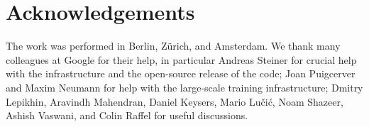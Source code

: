 





\section*{Acknowledgements}
The work was performed in Berlin, Z\"urich, and Amsterdam. We thank many colleagues at Google for their help, in particular Andreas Steiner for crucial help with the infrastructure and the open-source release of the code; Joan Puigcerver and Maxim Neumann for help with the large-scale training infrastructure; Dmitry Lepikhin, Aravindh Mahendran, Daniel Keysers, Mario Lu\v{c}i\'{c}, Noam Shazeer, Ashish Vaswani, and Colin Raffel for useful discussions.





\newpage







\usepackage{amsmath,amsfonts,bm}

\newcommand{\figleft}{{\em (Left)}}
\newcommand{\figcenter}{{\em (Center)}}
\newcommand{\figright}{{\em (Right)}}
\newcommand{\figtop}{{\em (Top)}}
\newcommand{\figbottom}{{\em (Bottom)}}
\newcommand{\captiona}{{\em (a)}}
\newcommand{\captionb}{{\em (b)}}
\newcommand{\captionc}{{\em (c)}}
\newcommand{\captiond}{{\em (d)}}

\newcommand{\newterm}[1]{{\bf #1}}


\def\figref#1{figure~\ref{#1}}
\def\Figref#1{Figure~\ref{#1}}
\def\twofigref#1#2{figures \ref{#1} and \ref{#2}}
\def\quadfigref#1#2#3#4{figures \ref{#1}, \ref{#2}, \ref{#3} and \ref{#4}}
\def\secref#1{section~\ref{#1}}
\def\Secref#1{Section~\ref{#1}}
\def\twosecrefs#1#2{sections \ref{#1} and \ref{#2}}
\def\secrefs#1#2#3{sections \ref{#1}, \ref{#2} and \ref{#3}}
\def\eqref#1{equation~\ref{#1}}
\def\Eqref#1{Equation~\ref{#1}}
\def\plaineqref#1{\ref{#1}}
\def\chapref#1{chapter~\ref{#1}}
\def\Chapref#1{Chapter~\ref{#1}}
\def\rangechapref#1#2{chapters\ref{#1}--\ref{#2}}
\def\algref#1{algorithm~\ref{#1}}
\def\Algref#1{Algorithm~\ref{#1}}
\def\twoalgref#1#2{algorithms \ref{#1} and \ref{#2}}
\def\Twoalgref#1#2{Algorithms \ref{#1} and \ref{#2}}
\def\partref#1{part~\ref{#1}}
\def\Partref#1{Part~\ref{#1}}
\def\twopartref#1#2{parts \ref{#1} and \ref{#2}}

\def\ceil#1{\lceil #1 \rceil}
\def\floor#1{\lfloor #1 \rfloor}
\def\1{\bm{1}}
\newcommand{\train}{\mathcal{D}}
\newcommand{\valid}{\mathcal{D_{\mathrm{valid}}}}
\newcommand{\test}{\mathcal{D_{\mathrm{test}}}}

